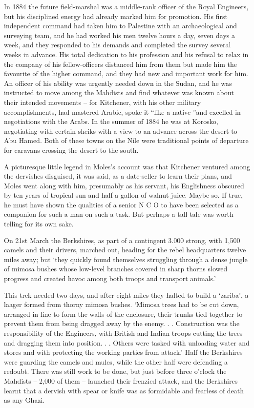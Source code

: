 In 1884 the future field-marshal was a middle-rank officer of the Royal Engineers, but his disciplined energy had already marked him for promotion. His first independent command had taken him to Palestine with an archaeological and surveying team, and he had worked his men twelve hours a day, seven days a week, and they responded to his demands and completed the survey several weeks in advance. His total dedication to his profession and his refusal to relax in the company of his fellow-officers distanced him from them but made him the favourite of the higher command, and they had new and important work for him. An officer of his ability was urgently needed down in the Sudan, and he was instructed to move among the Mahdists and find whatever was known about their intended movements – for Kitchener, with his other military accomplishments, had mastered Arabic, spoke it “like a native ”and excelled in negotiations with the Arabs. In the summer of 1884 he was at Korosko, negotiating with certain sheiks with a view to an advance across the desert to Abu Hamed. Both of these towns on the Nile were traditional points of departure for caravans crossing the desert to the south.

A picturesque little legend in Moles’s account was that Kitchener ventured among the dervishes disguised, it was said, as a date-seller to learn their plans, and Moles went along with him, presumably as his servant, his Englishness obscured by ten years of tropical sun and half a gallon of walnut juice. Maybe so. If true, he must have shown the qualities of a senior N C O to have been selected as a companion for such a man on such a task. But perhaps a tall tale was worth telling for its own sake. 

On 21st March the Berkshires, as part of a contingent 3.000 strong, with 1,500 camels and their drivers, marched out, heading for the rebel headquarters twelve miles away; but ‘they quickly found themselves struggling through a dense jungle of mimosa bushes whose low-level branches covered in sharp thorns slowed progress and created havoc among both troops and transport animals.’

This trek needed two days, and after eight miles they halted to build a ‘zariba’, a laager formed from thorny mimosa bushes. ‘Mimosa trees had to be cut down, arranged in line to form the walls of the enclosure, their trunks tied together to prevent them from being dragged away by the enemy. . . Construction was the responsibility of the Engineers, with British and Indian troops cutting the trees and dragging them into position. . . Others were tasked with unloading water and stores and with protecting the working parties from attack.’ Half the Berkshires were guarding the camels and mules, while the other half were defending a redoubt. There was still work to be done, but just before three o’clock the Mahdists – 2,000 of them – launched their frenzied attack, and the Berkshires learnt that a dervish with spear or knife was as formidable and fearless of death as any Ghazi.

